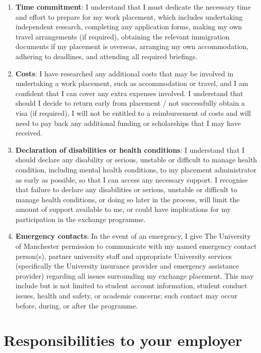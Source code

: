 \documentclass[
]{book}
\providecommand{\tightlist}{%
  \setlength{\itemsep}{0pt}\setlength{\parskip}{0pt}}
\begin{document}
\begin{enumerate}
\def\labelenumi{\arabic{enumi}.}
\tightlist
\item
  \textbf{Time commitment}: I understand that I must dedicate the necessary time and effort to prepare for my work placement, which includes undertaking independent research, completing any application forms, making my own travel arrangements (if required), obtaining the relevant immigration documents if my
  placement is overseas, arranging my own accommodation, adhering to deadlines, and attending all required briefings.
\item
  \textbf{Costs}: I have researched any additional costs that may be involved in undertaking a work placement, such as accommodation or travel, and I am confident that I can cover any extra expenses involved. I understand that should I decide to return early from placement / not successfully obtain a visa (if required), I will not be entitled to a reimbursement of costs and will need to pay back any additional funding or scholarships that I may have received.
\item
  \textbf{Declaration of disabilities or health conditions}: I understand that I should declare any disability or serious, unstable or difficult to manage health condition, including mental health conditions, to my placement administrator as early as possible, so that I can access any necessary support. I recognise that failure to declare any disabilities or serious, unstable or difficult to manage health conditions, or doing so later in the process, will limit the amount of support available to me, or could have implications for my participation in the exchange programme.
\item
  \textbf{Emergency contacts}: In the event of an emergency, I give The University of Manchester permission to communicate with my named emergency contact person(s), partner university staff and appropriate University services (specifically the University insurance provider and emergency assistance provider) regarding all issues surrounding my exchange placement. This may include but is not limited to student account information, student conduct issues, health and safety, or academic concerns; such contact
  may occur before, during, or after the programme.
\end{enumerate}

\section{Responsibilities to your employer}\label{remployer}
\end{document}
